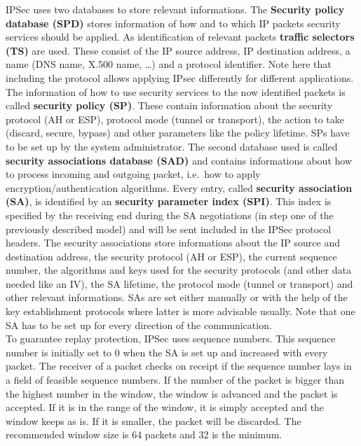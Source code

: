 IPSec uses two databases to store relevant informations.
The \textbf{Security policy database (SPD)} stores information of how and to which IP packets security services should be applied.
As identification of relevant packets \textbf{traffic selectors (TS)} are used.
These consist of the IP source address, IP destination address, a name (DNS name, X.500 name, \dots) and a protocol identifier.
Note here that including the protocol allows applying IPsec differently for different applications.
The information of how to use security services to the now identified packets is called \textbf{security policy (SP)}.
These contain information about the security protocol (AH or ESP), protocol mode (tunnel or transport), the action to take (discard, secure, bypass) and other parameters like the policy lifetime.
SPs have to be set up by the system administrator.
The second database used is called \textbf{security associations database (SAD)} and contains informations about how to process incoming and outgoing packet, i.e.\ how to apply encryption/authentication algorithms.
Every entry, called \textbf{security association (SA)}, is identified by an \textbf{security parameter index (SPI)}.
This index is specified by the receiving end during the SA negotiations (in step one of the previously described model) and will be sent included in the IPSec protocol headers.
The security associations store informations about the IP source and destination address, the security protocol (AH or ESP), the current sequence number, the algorithms and keys used for the security protocols (and other data needed like an IV), the SA lifetime, the protocol mode (tunnel or transport) and other relevant informations.
SAs are set either manually or with the help of the key establishment protocols where latter is more advisable usually.
Note that one SA has to be set up for every direction of the communication.\\

To guarantee replay protection, IPSec uses sequence numbers.
This sequence number is initially set to 0 when the SA is set up and increased with every packet.
The receiver of a packet checks on receipt if the sequence number lays in a field of feasible sequence numbers.
If the number of the packet is bigger than the highest number in the window, the window is advanced and the packet is accepted.
If it is in the range of the window, it is simply accepted and the window keeps as is.
If it is smaller, the packet will be discarded.
The recommended window size is 64 packets and 32 is the minimum.

